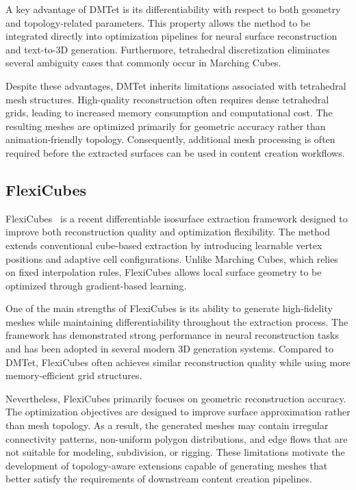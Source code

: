 \documentclass[../main.tex]{subfiles}
\begin{document}
A key advantage of DMTet is its differentiability with respect to both geometry and topology-related parameters. This property allows the method to be integrated directly into optimization pipelines for neural surface reconstruction and text-to-3D generation. Furthermore, tetrahedral discretization eliminates several ambiguity cases that commonly occur in Marching Cubes.

Despite these advantages, DMTet inherits limitations associated with tetrahedral mesh structures. High-quality reconstruction often requires dense tetrahedral grids, leading to increased memory consumption and computational cost. The resulting meshes are optimized primarily for geometric accuracy rather than animation-friendly topology. Consequently, additional mesh processing is often required before the extracted surfaces can be used in content creation workflows.

\subsection{FlexiCubes}

FlexiCubes~\cite{shen2023flexicubes} is a recent differentiable isosurface extraction framework designed to improve both reconstruction quality and optimization flexibility. The method extends conventional cube-based extraction by introducing learnable vertex positions and adaptive cell configurations. Unlike Marching Cubes, which relies on fixed interpolation rules, FlexiCubes allows local surface geometry to be optimized through gradient-based learning.

One of the main strengths of FlexiCubes is its ability to generate high-fidelity meshes while maintaining differentiability throughout the extraction process. The framework has demonstrated strong performance in neural reconstruction tasks and has been adopted in several modern 3D generation systems. Compared to DMTet, FlexiCubes often achieves similar reconstruction quality while using more memory-efficient grid structures.

Nevertheless, FlexiCubes primarily focuses on geometric reconstruction accuracy. The optimization objectives are designed to improve surface approximation rather than mesh topology. As a result, the generated meshes may contain irregular connectivity patterns, non-uniform polygon distributions, and edge flows that are not suitable for modeling, subdivision, or rigging. These limitations motivate the development of topology-aware extensions capable of generating meshes that better satisfy the requirements of downstream content creation pipelines.
\end{document}
